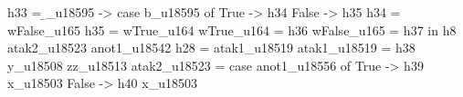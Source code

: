                                                                                                                                                 h33 = \b_u18595 -> case b_u18595 of
                                                                                                                                                                     True ->
                                                                                                                                                                       h34
                                                                                                                                                                     False ->
                                                                                                                                                                       h35
                                                                                                                                                h34 = wFalse_u165
                                                                                                                                                h35 = wTrue_u164
                                                                                                                                                wTrue_u164 = h36
                                                                                                                                                wFalse_u165 = h37
                                                                                                                                              in h8 atak2_u18523 anot1_u18542
                                                                                                                        h28 = atak1_u18519
                                                                                                                        atak1_u18519 = h38 y_u18508 zz_u18513
                                                                                                                        atak2_u18523 = case anot1_u18556 of
                                                                                                                                         True ->
                                                                                                                                           h39 x_u18503
                                                                                                                                         False ->
                                                                                                                                           h40 x_u18503
